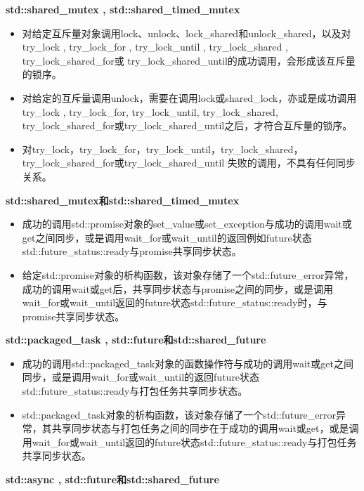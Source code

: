 \textbf{std::shared\_mutex ,  std::shared\_timed\_mutex}

\begin{itemize}
    \item 对给定互斥量对象调用lock、unlock、lock\_shared和unlock\_shared，以及对 try\_lock ,  try\_lock\_for ,  try\_lock\_until ,  try\_lock\_shared ,  try\_lock\_shared\_for或 try\_lock\_shared\_until的成功调用，会形成该互斥量的锁序。
    \item 对给定的互斥量调用unlock，需要在调用lock或shared\_lock，亦或是成功调用try\_lock ,  try\_lock\_for,  try\_lock\_until,  try\_lock\_shared,  try\_lock\_shared\_for或try\_lock\_shared\_until之后，才符合互斥量的锁序。
    \item 对try\_lock，try\_lock\_for，try\_lock\_until，try\_lock\_shared，try\_lock\_shared\_for或try\_lock\_shared\_until 失败的调用，不具有任何同步关系。
\end{itemize}

\textbf{std::shared\_mutex和std::shared\_timed\_mutex}

\begin{itemize}
    \item 成功的调用std::promise对象的set\_value或set\_exception与成功的调用wait或get之间同步，或是调用wait\_for或wait\_until的返回例如future状态std::future\_status::ready与promise共享同步状态。
    \item 给定std::promise对象的析构函数，该对象存储了一个std::future\_error异常，成功的调用wait或get后，共享同步状态与promise之间的同步，或是调用wait\_for或wait\_until返回的future状态std::future\_status::ready时，与promise共享同步状态。
\end{itemize}

\textbf{std::packaged\_task ,  std::future和std::shared\_future}

\begin{itemize}
    \item 成功的调用std::packaged\_task对象的函数操作符与成功的调用wait或get之间同步，或是调用wait\_for或wait\_until的返回future状态std::future\_status::ready与打包任务共享同步状态。
    \item std::packaged\_task对象的析构函数，该对象存储了一个std::future\_error异常，其共享同步状态与打包任务之间的同步在于成功的调用wait或get，或是调用wait\_for或wait\_until返回的future状态std::future\_status::ready与打包任务共享同步状态。
\end{itemize}

\textbf{std::async ,  std::future和std::shared\_future}

